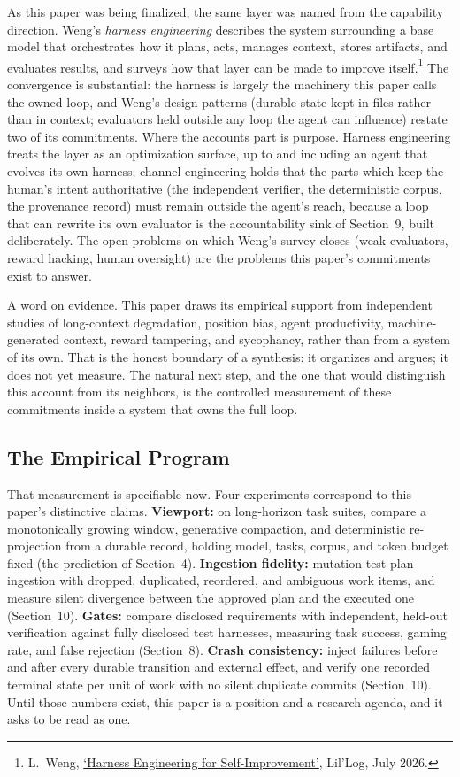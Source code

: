 \documentclass[11pt, a4paper]{article}
\begin{document}
As this paper was being finalized, the same layer was named from the capability
direction. Weng's \emph{harness engineering} describes the system surrounding a base
model that orchestrates how it plans, acts, manages context, stores artifacts, and
evaluates results, and surveys how that layer can be made to improve
itself.\footnote{L.~Weng, \href{https://lilianweng.github.io/posts/2026-07-04-harness/}{`Harness
Engineering for Self-Improvement'}, Lil'Log, July 2026.} The convergence is substantial:
the harness is largely the machinery this paper calls the owned loop, and Weng's design
patterns (durable state kept in files rather than in context; evaluators held outside any
loop the agent can influence) restate two of its commitments. Where the accounts part is
purpose. Harness engineering treats the layer as an optimization surface, up to and
including an agent that evolves its own harness; channel engineering holds that the parts
which keep the human's intent authoritative (the independent verifier, the deterministic
corpus, the provenance record) must remain outside the agent's reach, because a loop
that can rewrite its own evaluator is the accountability sink of Section~9, built
deliberately. The open problems on which Weng's survey closes (weak evaluators, reward
hacking, human oversight) are the problems this paper's commitments exist to answer.

A word on evidence. This paper draws its empirical support from independent studies of
long-context degradation, position bias, agent productivity, machine-generated context,
reward tampering, and sycophancy, rather than from a system of its own. That is the honest
boundary of a synthesis: it organizes and argues; it does not yet measure. The natural next
step, and the one that would distinguish this account from its neighbors, is the controlled
measurement of these commitments inside a system that owns the full loop.

\subsection*{The Empirical Program}

That measurement is specifiable now. Four experiments correspond to this paper's
distinctive claims. \textbf{Viewport:} on long-horizon task suites, compare a
monotonically growing window, generative compaction, and deterministic re-projection
from a durable record, holding model, tasks, corpus, and token budget fixed (the
prediction of Section~4). \textbf{Ingestion fidelity:} mutation-test plan ingestion with
dropped, duplicated, reordered, and ambiguous work items, and measure silent divergence
between the approved plan and the executed one (Section~10). \textbf{Gates:} compare
disclosed requirements with independent, held-out verification against fully disclosed
test harnesses, measuring task success, gaming rate, and false rejection (Section~8).
\textbf{Crash consistency:} inject failures before and after every durable transition
and external effect, and verify one recorded terminal state per unit of work with no
silent duplicate commits (Section~10). Until those numbers exist, this paper is a
position and a research agenda, and it asks to be read as one.
\end{document}
